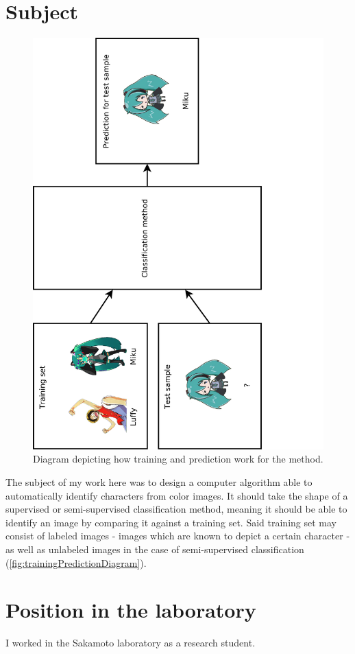 \section{Subject}
\begin{figure}[htb!]
\centerline{
\includegraphics[height=1.2\textwidth, angle=270,clip=true,trim=0 0 4cm 0]{images/trainingPredictionDiagram.pdf}
}
\caption{Diagram depicting how training and prediction work for the method.}
\label{fig:trainingPredictionDiagram}
\end{figure}

The subject of my work here was to design a computer algorithm able to automatically identify characters from color images. It should take the shape of a supervised or semi-supervised classification method, meaning it should be able to identify an image by comparing it against a training set. Said training set may consist of labeled images - images which are known to depict a certain character - as well as unlabeled images in the case of semi-supervised classification (\autoref{fig:trainingPredictionDiagram}).

\section{Position in the laboratory}
I worked in the Sakamoto laboratory as a research student.

